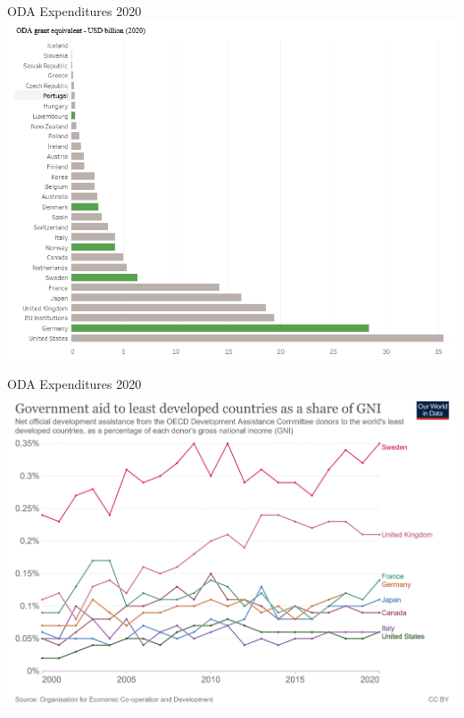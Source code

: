 \documentclass{beamer}
\begin{document}
\begin{frame}{\LARGE ODA Expenditures 2020}
	\centering
	\includegraphics[width=\textwidth,height=.9\textheight,keepaspectratio]{ODAinUSD2020.png}
\end{frame}

\begin{frame}{\LARGE ODA Expenditures 2020}
    \centering
\includegraphics[width=\textwidth,height=.9\textheight,keepaspectratio]{ODAinGNI2020.png}
\end{frame}
\end{document}
